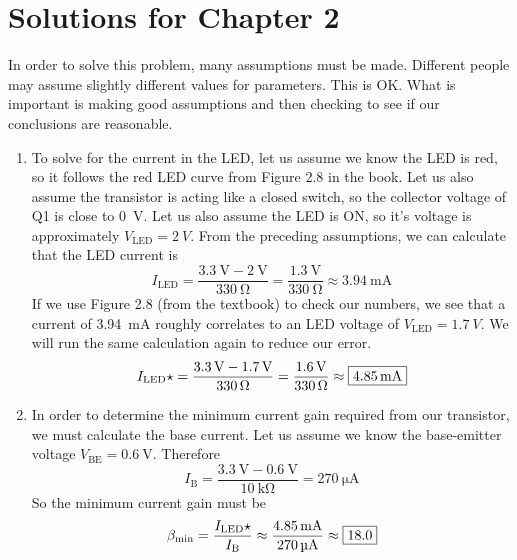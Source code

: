 \chapter{Solutions for Chapter 2}

In order to solve this problem, many assumptions must be made.
Different people may assume slightly different values for parameters.
This is OK.
What is important is making good assumptions and then checking to see if our conclusions are reasonable.
\begin{enumerate}
    \item
    To solve for the current in the LED, let us assume we know the LED is red, so it follows the red LED curve from Figure 2.8 in the book.
    Let us also assume the transistor is acting like a closed switch, so the collector voltage of Q1 is close to \SI{0}{\V}.
    Let us also assume the LED is ON, so it's voltage is approximately $V_\text{LED} = \SI{2}{V}$. From the preceding assumptions, we can calculate that the LED current is
    \[I_\text{LED} = \frac{\SI{3.3}{\V} - \SI{2}{\V}}{\SI{330}{\ohm}} = \frac{\SI{1.3}{\V}}{\SI{330}{\ohm}} \approx \SI{3.94}{\mA}\]
    If we use Figure 2.8 (from the textbook) to check our numbers, we see that a current of \SI{3.94}{\mA} roughly correlates to an LED voltage of $V_\text{LED} = \SI{1.7}{V}$.  We will run the same calculation again to reduce our error.
    \[I_\text{LED}\star = \frac{\SI{3.3}{\V} - \SI{1.7}{\V}}{\SI{330}{\ohm}} = \frac{\SI{1.6}{\V}}{\SI{330}{\ohm}} \approx \mans{\SI{4.85}{\mA}}\]
    \item
    In order to determine the minimum current gain required from our transistor, we must calculate the base current.
    Let us assume we know the base-emitter voltage $V_\text{BE} = \SI{0.6}{\V}$.
    Therefore
    \[I_\text{B} = \frac{\SI{3.3}{\V} - \SI{0.6}{\V}}{\SI{10}{\kohm}} = \SI{270}{\uA}\]
    So the minimum current gain must be
    \[\beta_\text{min} = \frac{I_\text{LED}\star}{I_\text{B}} \approx \frac{\SI{4.85}{\mA}}{\SI{270}{\uA}} \approx \mans{18.0}\]
\end{enumerate}









